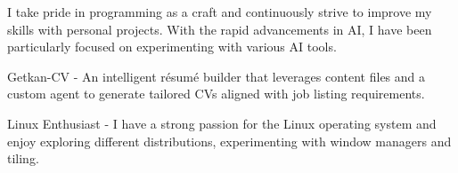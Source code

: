 \begin{cventries}
  \cventry
  {} %
  {} %
  {} %
  {} %
  {
    \vspace{-10mm}
    \begin{cvitems}
      \item {I take pride in programming as a craft and continuously strive to improve my skills with personal projects. With the rapid advancements in AI, I have been particularly focused on experimenting with various AI tools.}
    \end{cvitems}
    \begin{cvsubitems}
      \item {Getkan-CV - An intelligent résumé builder that leverages content files and a custom agent to generate tailored CVs aligned with job listing requirements.}
      \item {Linux Enthusiast - I have a strong passion for the Linux operating system and enjoy exploring different distributions, experimenting with window managers and tiling.}
    \end{cvsubitems}
  }
\end{cventries}
